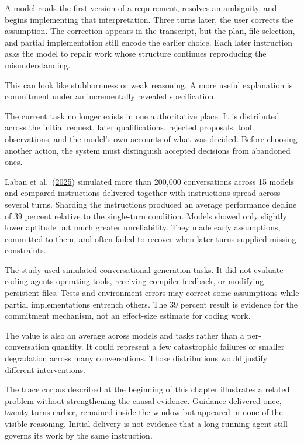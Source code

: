 A model reads the first version of a requirement, resolves an ambiguity, and begins implementing that interpretation. Three turns later, the user corrects the assumption. The correction appears in the transcript, but the plan, file selection, and partial implementation still encode the earlier choice. Each later instruction asks the model to repair work whose structure continues reproducing the misunderstanding.

This can look like stubbornness or weak reasoning. A more useful explanation is commitment under an incrementally revealed specification.

The current task no longer exists in one authoritative place. It is distributed across the initial request, later qualifications, rejected proposals, tool observations, and the model's own accounts of what was decided. Before choosing another action, the system must distinguish accepted decisions from abandoned ones.

Laban et al.~(\href{https://arxiv.org/abs/2505.06120}{2025}) simulated more than 200,000 conversations across 15 models and compared instructions delivered together with instructions spread across several turns. Sharding the instructions produced an average performance decline of 39 percent relative to the single-turn condition. Models showed only slightly lower aptitude but much greater unreliability. They made early assumptions, committed to them, and often failed to recover when later turns supplied missing constraints.

The study used simulated conversational generation tasks. It did not evaluate coding agents operating tools, receiving compiler feedback, or modifying persistent files. Tests and environment errors may correct some assumptions while partial implementations entrench others. The 39 percent result is evidence for the commitment mechanism, not an effect-size estimate for coding work.

The value is also an average across models and tasks rather than a per-conversation quantity. It could represent a few catastrophic failures or smaller degradation across many conversations. Those distributions would justify different interventions.

The trace corpus described at the beginning of this chapter illustrates a related problem without strengthening the causal evidence. Guidance delivered once, twenty turns earlier, remained inside the window but appeared in none of the visible reasoning. Initial delivery is not evidence that a long-running agent still governs its work by the same instruction.

